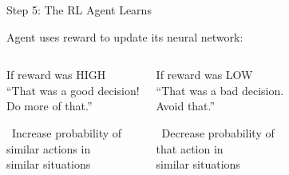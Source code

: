 \documentclass[aspectratio=169]{beamer}
\begin{document}
\begin{frame}{Step 5: The RL Agent Learns \faBrain}
\begin{block}{Agent uses reward to update its neural network:}
\end{block}

\vspace{0.5cm}

\begin{columns}[T]
\begin{exampleblock}{If reward was HIGH}
\centering
\faThumbsUp \\
\vspace{0.2cm}
``That was a good decision! \\
Do more of that.''

\vspace{0.3cm}
\faArrowUp\ Increase probability of \\
similar actions in \\
similar situations
\end{exampleblock}

\begin{alertblock}{If reward was LOW}
\centering
\faThumbsDown \\
\vspace{0.2cm}
``That was a bad decision. \\
Avoid that.''

\vspace{0.3cm}
\faArrowDown\ Decrease probability of \\
that action in \\
similar situations
\end{alertblock}
\end{columns}

\vspace{0.5cm}

\begin{center}
\end{center}
\end{frame}

\end{document}
